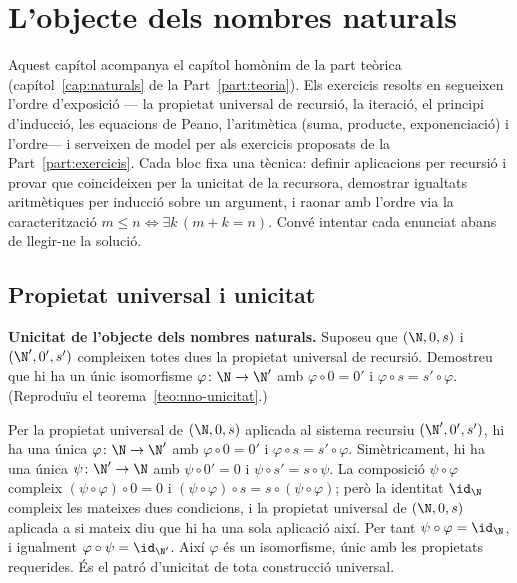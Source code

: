 \chapter{L'objecte dels nombres naturals}\label{cap:practica-naturals}

Aquest capítol acompanya el capítol homònim de la part teòrica (capítol~\ref{cap:naturals} de la Part~\ref{part:teoria}). Els exercicis resolts en segueixen l'ordre d'exposició --- la propietat universal de recursió, la iteració, el principi d'inducció, les equacions de Peano, l'aritmètica (suma, producte, exponenciació) i l'ordre--- i serveixen de model per als exercicis proposats de la Part~\ref{part:exercicis}. Cada bloc fixa una tècnica: definir aplicacions per recursió i provar que coincideixen per la unicitat de la recursora, demostrar igualtats aritmètiques per inducció sobre un argument, i raonar amb l'ordre via la caracterització \(m\le n\iff\exists k\,(m+k=n)\). Convé intentar cada enunciat abans de llegir-ne la solució.

\section{Propietat universal i unicitat}\label{prac:nno-universal}

\begin{exercici}
\textbf{Unicitat de l'objecte dels nombres naturals.} Suposeu que \((\N,0,s)\) i \((\N',0',s')\) compleixen totes dues la propietat universal de recursió. Demostreu que hi ha un únic isomorfisme \(\varphi\colon\N\to\N'\) amb \(\varphi\circ0=0'\) i \(\varphi\circ s=s'\circ\varphi\). (Reproduïu el teorema~\ref{teo:nno-unicitat}.)
\end{exercici}
\begin{solucio}
Per la propietat universal de \((\N,0,s)\) aplicada al sistema recursiu \((\N',0',s')\), hi ha una única \(\varphi\colon\N\to\N'\) amb \(\varphi\circ0=0'\) i \(\varphi\circ s=s'\circ\varphi\). Simètricament, hi ha una única \(\psi\colon\N'\to\N\) amb \(\psi\circ0'=0\) i \(\psi\circ s'=s\circ\psi\). La composició \(\psi\circ\varphi\) compleix \((\psi\circ\varphi)\circ0=0\) i \((\psi\circ\varphi)\circ s=s\circ(\psi\circ\varphi)\); però la identitat \(\id_\N\) compleix les mateixes dues condicions, i la propietat universal de \((\N,0,s)\) aplicada a si mateix diu que hi ha una sola aplicació així. Per tant \(\psi\circ\varphi=\id_\N\), i igualment \(\varphi\circ\psi=\id_{\N'}\). Així \(\varphi\) és un isomorfisme, únic amb les propietats requerides. És el patró d'unicitat de tota construcció universal.
\end{solucio}


